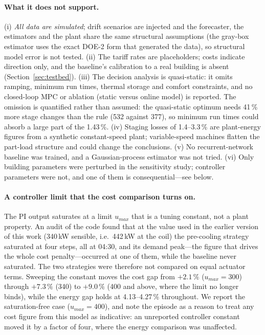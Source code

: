 \documentclass{svproc}
\begin{document}
\paragraph{What it does not support.} (i) \emph{All data are simulated}; drift scenarios are injected and the forecaster, the estimators and the plant share the same structural assumptions (the gray-box estimator uses the exact DOE-2 form that generated the data), so structural model error is not tested. (ii) The tariff rates are placeholders; costs indicate direction only, and the baseline's calibration to a real building is absent (Section~\ref{sec:testbed}). (iii) The decision analysis is quasi-static: it omits ramping, minimum run times, thermal storage and comfort constraints, and no closed-loop MPC or ablation (static versus online model) is reported. The omission is quantified rather than assumed: the quasi-static optimum needs 41\,\% more stage changes than the rule (532 against 377), so minimum run times could absorb a large part of the 1.43\,\%. (iv) Staging losses of 1.4--3.3\,\% are plant-energy figures from a synthetic constant-speed plant; variable-speed machines flatten the part-load structure and could change the conclusions. (v) No recurrent-network baseline was trained, and a Gaussian-process estimator was not tried. (vi) Only building parameters were perturbed in the sensitivity study; controller parameters were not, and one of them is consequential---see below.

\paragraph{A controller limit that the cost comparison turns on.} The PI output saturates at a limit $u_{max}$ that is a tuning constant, not a plant property. An audit of the code found that at the value used in the earlier version of this work (340\,kW sensible, i.e.\ 442\,kW at the coil) the pre-cooling strategy saturated at four steps, all at 04:30, and its demand peak---the figure that drives the whole cost penalty---occurred at one of them, while the baseline never saturated. The two strategies were therefore not compared on equal actuator terms. Sweeping the constant moves the cost gap from $+2.1\,\%$ ($u_{max}=300$) through $+7.3\,\%$ (340) to $+9.0\,\%$ (400 and above, where the limit no longer binds), while the energy gap holds at 4.13--4.27\,\% throughout. We report the saturation-free case ($u_{max}=400$), and note the episode as a reason to treat any cost figure from this model as indicative: an unreported controller constant moved it by a factor of four, where the energy comparison was unaffected.
\end{document}

